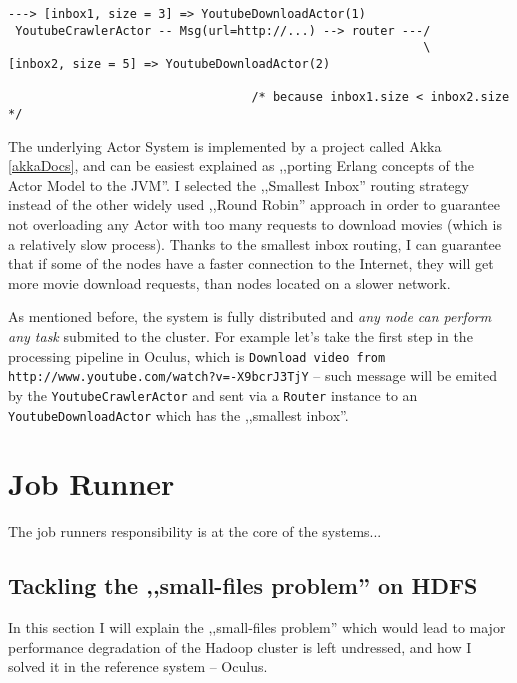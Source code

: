 \begin{lstlisting}[caption={smallest-inbox routing algorithm},label={lst:akka-router-smallest-inbox}]
                                                           ---> [inbox1, size = 3] => YoutubeDownloadActor(1)
 YoutubeCrawlerActor -- Msg(url=http://...) --> router ---/
                                                          \     [inbox2, size = 5] => YoutubeDownloadActor(2)
                                                                   
                                  /* because inbox1.size < inbox2.size */ 
\end{lstlisting}

The underlying Actor System is implemented by a project called Akka \ref{akkaDocs}, and can be easiest explained as ,,porting Erlang concepts of the Actor Model to the JVM''. I selected the ,,Smallest Inbox'' routing strategy instead of the other widely used ,,Round Robin'' approach in order to guarantee not overloading any Actor with too many requests to download movies (which is a relatively slow process). Thanks to the smallest inbox routing, I can guarantee that if some of the nodes have a faster connection to the Internet, they will get more movie download requests, than nodes located on a slower network.

As mentioned before, the system is fully distributed and \textit{any node can perform any task} submited to the cluster. For example let's take the first step in the processing pipeline in Oculus, which is \verb|Download video from http://www.youtube.com/watch?v=-X9bcrJ3TjY| -- such message will be emited by the \verb|YoutubeCrawlerActor| and sent via a \verb|Router| instance to an \verb|YoutubeDownloadActor| which has the ,,smallest inbox''.


\section{Job Runner}
The job runners responsibility is at the core of the systems... 

\subsection{Tackling the ,,small-files problem'' on HDFS}
In this section I will explain the ,,small-files problem'' which would lead to major performance degradation of the Hadoop cluster is left undressed, and how I solved it in the reference system -- Oculus.

